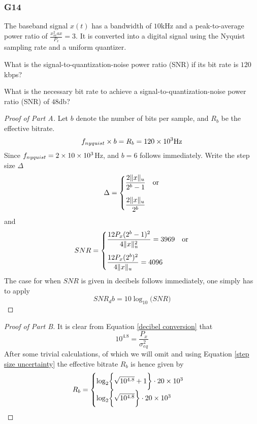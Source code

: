\documentclass[../main.tex]{subfiles}
\begin{document}
\subsubsection*{G14}
\begin{wts}
    The baseband signal $x(t)$ has a bandwidth of $10$kHz and a peak-to-average power ratio of $\frac{x^2_max}{P_x}=3$. It is converted into a digital signal using the Nyquist sampling rate and a uniform quantizer.
    \begin{enumalpha}
        \item What is the signal-to-quantization-noise power ratio (SNR) if its bit rate is $120$ kbps?
        \item What is the necessary bit rate to achieve a signal-to-quantization-noise power ratio (SNR) of $48$db?
    \end{enumalpha}
\end{wts}
\begin{proof}[Proof of Part A]
    Let $b$ denote the number of bits per sample, and $R_b$ be the effective bitrate.
    \[f_{nyquist}\times b = R_b = 120\times 10^{3}\mathrm{Hz}\]
    Since $f_{nyquist}=2\times 10\times 10^{3}$Hz, and $b=6$ follows immediately. Write the step size $\Delta$
    \begin{equation}\label{step size uncertainty}
    \Delta = \begin{cases}\dfrac{2\lVert {x} \rVert_u}{2^b-1}&\text{or}\\[3ex]
    \dfrac{2\lVert {x} \rVert_u}{2^b}
    \end{cases}
    \end{equation}
    and
    \[SNR =\begin{cases} \dfrac{12P_x(2^b-1)^2}{4\lVert {x} \rVert_u^2}=3969&\text{or}\\[3ex]
    \dfrac{12P_x(2^b)^2}{4\lVert {x} \rVert_u}=4096
    \end{cases}\]
    The case for when $SNR$ is given in decibels follows immediately, one simply has to apply
    \begin{equation}\label{decibel conversion}
    SNR_db = 10\log_{10}\biggl(SNR\biggr)
    \end{equation}
\end{proof}
\begin{proof}[Proof of Part B]
    It is clear from Equation \eqref{decibel conversion} that 
    \[10^{4.8}=\dfrac{P_x}{\sigma_{eq}^2}\]
    After some trivial calculations, of which we will omit and using Equation \eqref{step size uncertainty} the effective bitrate $R_b$ is hence given by
    \[R_b=\begin{cases}\log_2\biggl\{\sqrt{10^{4.8}}+1\biggr\}\cdot 20\times 10^{3}\\
    \log_2\biggl\{\sqrt{10^{4.8}}\biggr\}\cdot 20\times 10^{3}\end{cases}\]
\end{proof}
\end{document}
